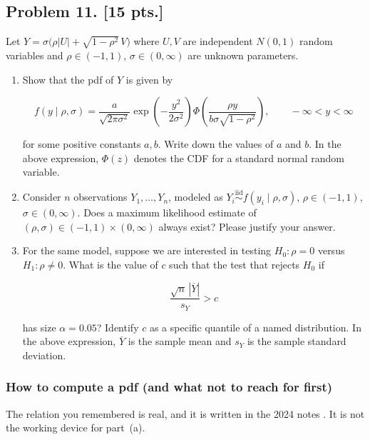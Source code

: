 \documentclass[11pt,a4paper]{article}
\begin{document}
\subsection{Problem 11. [15 pts.]}
Let \( Y = \sigma\bigl(\rho |U| + \sqrt{1 - \rho^2}\, V\bigr) \) where \( U, V \) are independent \( N(0, 1) \) random variables and \( \rho \in (-1, 1) \), \( \sigma \in (0, \infty) \) are unknown parameters.
\begin{enumerate}[label=(\alph*)]
    \item Show that the pdf of \( Y \) is given by

    \[
    f(y \mid \rho, \sigma)
    =
    \frac{a}{\sqrt{2\pi\sigma^2}}
    \exp\left(-\frac{y^2}{2\sigma^2}\right)
    \Phi\left( \frac{\rho y}{b\sigma\sqrt{1-\rho^2}} \right),
    \qquad -\infty < y < \infty
    \]

    for some positive constants \( a, b \). Write down the values of \( a \) and \( b \). In the above expression, \( \Phi(z) \) denotes the CDF for a standard normal random variable.
    \item Consider \( n \) observations \( Y_1, \dots, Y_n \), modeled as \( Y_i \stackrel{\mathrm{iid}}{\sim} f(y_i \mid \rho, \sigma) \), \( \rho \in (-1, 1) \), \( \sigma \in (0, \infty) \). Does a maximum likelihood estimate of \( (\rho, \sigma) \in (-1, 1) \times (0, \infty) \) always exist? Please justify your answer.
    \item For the same model, suppose we are interested in testing \( H_0 : \rho = 0 \) versus \( H_1 : \rho \neq 0 \). What is the value of \( c \) such that the test that rejects \( H_0 \) if

    \[
    \frac{\sqrt{n}\, |\overline{Y}|}{s_Y} > c
    \]

    has size \( \alpha = 0.05 \)? Identify \( c \) as a specific quantile of a named distribution. In the above expression, \( \overline{Y} \) is the sample mean and \( s_Y \) is the sample standard deviation.
\end{enumerate}

\setcounter{section}{11}
\setcounter{definition}{0}

\subsubsection{How to compute a pdf (and what not to reach for first)}

The relation you remembered is real, and it is written in the 2024 notes \citep{ren2024}. It is not the working device for part~(a).
\end{document}
